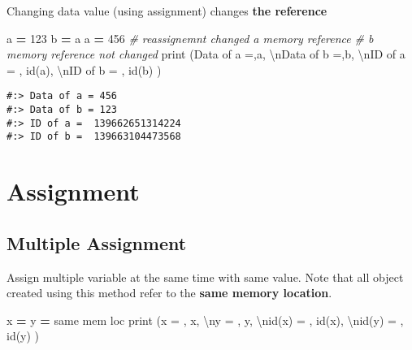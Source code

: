 \documentclass[
]{book}
\newenvironment{Shaded}{\begin{snugshade}}{\end{snugshade}}
\newcommand{\BuiltInTok}[1]{#1}
\newcommand{\CharTok}[1]{\textcolor[rgb]{0.5,0.5,0.5}{#1}}
\newcommand{\CommentTok}[1]{\textcolor[rgb]{0.37,0.37,0.37}{\textit{#1}}}
\newcommand{\DecValTok}[1]{\textcolor[rgb]{0.06,0.06,0.06}{#1}}
\newcommand{\NormalTok}[1]{#1}
\newcommand{\OperatorTok}[1]{\textcolor[rgb]{0.43,0.43,0.43}{\textbf{#1}}}
\newcommand{\StringTok}[1]{\textcolor[rgb]{0.5,0.5,0.5}{#1}}
\begin{document}
Changing data value (using assignment) changes \textbf{the reference}

\begin{Shaded}
\begin{Highlighting}[]
\NormalTok{a }\OperatorTok{=} \DecValTok{123}
\NormalTok{b }\OperatorTok{=}\NormalTok{ a}
\NormalTok{a }\OperatorTok{=} \DecValTok{456}  \CommentTok{\# reassignemnt changed a memory reference}
         \CommentTok{\# b memory reference not changed}
\BuiltInTok{print}\NormalTok{ (}\StringTok{\textquotesingle{}Data of a =\textquotesingle{}}\NormalTok{,a,}
     \StringTok{\textquotesingle{}}\CharTok{\textbackslash{}n}\StringTok{Data of b =\textquotesingle{}}\NormalTok{,b,}
     \StringTok{\textquotesingle{}}\CharTok{\textbackslash{}n}\StringTok{ID of a = \textquotesingle{}}\NormalTok{, }\BuiltInTok{id}\NormalTok{(a),}
     \StringTok{\textquotesingle{}}\CharTok{\textbackslash{}n}\StringTok{ID of b = \textquotesingle{}}\NormalTok{, }\BuiltInTok{id}\NormalTok{(b)}
\NormalTok{)}
\end{Highlighting}
\end{Shaded}

\begin{verbatim}
#:> Data of a = 456 
#:> Data of b = 123 
#:> ID of a =  139662651314224 
#:> ID of b =  139663104473568
\end{verbatim}

\hypertarget{assignment}{%
\section{Assignment}\label{assignment}}

\hypertarget{multiple-assignment}{%
\subsection{Multiple Assignment}\label{multiple-assignment}}

Assign multiple variable at the same time with same value. Note that all object created using this method refer to the \textbf{same memory location}.

\begin{Shaded}
\begin{Highlighting}[]
\NormalTok{x }\OperatorTok{=}\NormalTok{ y }\OperatorTok{=} \StringTok{\textquotesingle{}same mem loc\textquotesingle{}}
\BuiltInTok{print}\NormalTok{ (}\StringTok{\textquotesingle{}x = \textquotesingle{}}\NormalTok{, x,}
     \StringTok{\textquotesingle{}}\CharTok{\textbackslash{}n}\StringTok{y = \textquotesingle{}}\NormalTok{, y,}
     \StringTok{\textquotesingle{}}\CharTok{\textbackslash{}n}\StringTok{id(x) = \textquotesingle{}}\NormalTok{, }\BuiltInTok{id}\NormalTok{(x), }
     \StringTok{\textquotesingle{}}\CharTok{\textbackslash{}n}\StringTok{id(y) = \textquotesingle{}}\NormalTok{, }\BuiltInTok{id}\NormalTok{(y)}
\NormalTok{)}
\end{Highlighting}
\end{Shaded}
\end{document}
